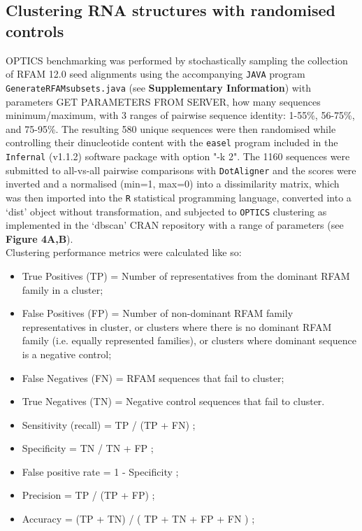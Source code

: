 \documentclass[a4paper,11pt]{article}
\newcommand\dotaligner{\texttt{DotAligner}}
\begin{document}
\subsection*{ Clustering RNA structures with randomised controls }
OPTICS benchmarking was performed by stochastically sampling the collection of RFAM 12.0 
seed alignments using the accompanying \texttt{JAVA} program \texttt{GenerateRFAMsubsets.java}
(see \textbf{Supplementary Information}) with parameters {\color{red} GET PARAMETERS FROM SERVER, how many sequences minimum/maximum}, 
with 3 ranges of pairwise sequence identity: 1-55\%, 56-75\%, and 75-95\%.  The resulting
580 unique sequences were then randomised while controlling their dinucleotide content with 
the \texttt{easel} program included in the \texttt{Infernal} (v1.1.2) software package 
\cite{nawrocki2013infernal} with option "-k 2". The 1160 sequences were submitted to 
all-vs-all pairwise comparisons with \dotaligner{} and the scores were inverted and a 
normalised (min=1, max=0) into a dissimilarity matrix, which was then imported into
 the \texttt{R} statistical programming language, converted into a `dist' object without
 transformation, and subjected to \texttt{OPTICS} clustering as implemented
in the `dbscan' CRAN repository with a range of parameters (see \textbf{Figure 4A,B}).\\

\noindent Clustering performance metrics were calculated like so: 
\begin{itemize}
\item True Positives (TP) = Number of representatives from the dominant RFAM family in a cluster;
\item False Positives (FP) = Number of non-dominant RFAM family representatives in cluster, or clusters
where there is no dominant RFAM family (i.e. equally represented families), or clusters where dominant sequence is a negative control;
\item False Negatives (FN) = RFAM sequences that fail to cluster; 
\item True Negatives (TN) = Negative control sequences that fail to cluster. 
\item Sensitivity (recall) = TP  / (TP + FN) ;
\item Specificity  = TN / TN + FP ;
\item False positive rate =  1 - Specificity ;
\item Precision = TP / (TP + FP) ;
\item Accuracy = (TP + TN) / ( TP + TN + FP + FN )  ; 
\end{itemize}
\end{document}
